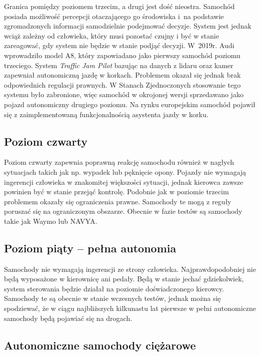 Granica pomiędzy poziomem trzecim, a drugi jest dość nieostra. 
Samochód posiada możliwość percepcji otaczającego go środowiska i~na podstawie zgromadzonych informacji samodzielnie podejmować decyzje. 
System jest jednak wciąż zależny od człowieka, który musi pozostać czujny i być w stanie zareagować, gdy system nie będzie w stanie podjąć decyzji. 
W~2019r. Audi wprowadziło model A8, który zapowiadano jako pierwszy samochód poziomu trzeciego. 
System \textit{Traffic Jam Pilot} bazując na danych z lidaru oraz kamer zapewniał autonomiczną jazdę w korkach. 
Problemem okazał się jednak brak odpowiednich regulacji prawnych. 
W Stanach Zjednoczonych stosowanie tego systemu było zabronione, więc samochód w okrojonej wersji sprzedawano jako pojazd autonomiczny drugiego poziomu. 
Na rynku europejskim samochód pojawił się z zaimplementowaną funkcjonalnością asystenta jazdy w korku.

\subsection{Poziom czwarty}

Poziom czwarty zapewnia poprawną reakcję samochodu również w nagłych sytuacjach takich jak np. wypadek lub pęknięcie opony. 
Pojazdy nie wymagają ingerencji człowieka w znakomitej większości sytuacji, jednak kierowca zawsze powinien być w stanie przejąć kontrolę. 
Podobnie jak w poziomie trzecim problemem okazały się ograniczenia prawne. 
Samochody te mogą z reguły poruszać się na ograniczonym obszarze. 
Obecnie w fazie testów są samochody takie jak Waymo lub NAVYA.

\subsection{Poziom piąty -- pełna autonomia}

Samochody nie wymagają ingerencji ze strony człowieka. 
Najprawdopodobniej nie będą wyposażone w kierownicę ani pedały. 
Będą w stanie jechać gdziekolwiek, system sterowania będzie działał na poziomie doświadczonego kierowcy. 
Samochody te są obecnie w stanie wczesnych testów, jednak można się spodziewać, że w ciągu najbliższych kilkunastu lat pierwsze w pełni autonomiczne samochody będą pojawiać się na drogach.


\subsection{Autonomiczne samochody ciężarowe}

